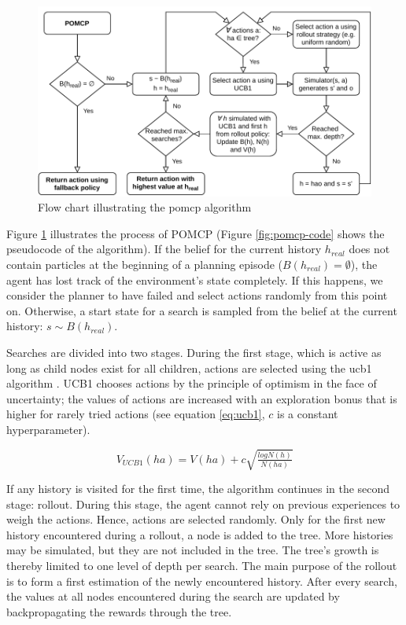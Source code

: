 \begin{figure}[htbp]
    \centerfloat
    \includegraphics[width=1.0\textwidth]{figures/POMCP.pdf}
    \caption{Flow chart illustrating the \acrfull{pomcp} algorithm}
    \label{fig:pomcp}
\end{figure}

Figure \ref{fig:pomcp} illustrates the process of POMCP (Figure \ref{fig:pomcp-code} shows the pseudocode of the algorithm). If the belief for the current history $h_{real}$ does not contain particles at the beginning of a planning episode ($B(h_{real}) = \emptyset$), the agent has lost track of the environment's state completely. If this happens, we consider the planner to have failed and select actions randomly from this point on. Otherwise, a start state for a search is sampled from the belief at the current history: $ s \sim B(h_ {real})$. 

Searches are divided into two stages. During the first stage, which is active as long as child nodes exist for all children, actions are selected using the \acrfull{ucb1} algorithm \parencite{ucb1}. UCB1 chooses actions by the principle of optimism in the face of uncertainty; the values of actions are increased with an exploration bonus that is higher for rarely tried actions (see equation \ref{eq:ucb1}, $c$ is a constant hyperparameter). 

\begin{equation}
    V_{UCB1}(ha) = V(ha) + c\sqrt{\tfrac{log N(h)}{N(ha)}}
    \label{eq:ucb1}
\end{equation}

If any history is visited for the first time, the algorithm continues in the second stage: rollout. During this stage, the agent cannot rely on previous experiences to weigh the actions. Hence, actions are selected randomly. Only for the first new history encountered during a rollout, a node is added to the tree. More histories may be simulated, but they are not included in the tree. The tree's growth is thereby limited to one level of depth per search. The main purpose of the rollout is to form a first estimation of the newly encountered history. After every search, the values at all nodes encountered during the search are updated by backpropagating the rewards through the tree.

